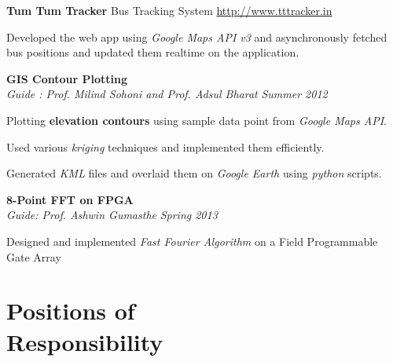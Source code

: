 \documentclass[margin,11pt]{resume}
\begin{document}
\begin{resume}
\textbf{Tum Tum Tracker} \hfill Bus Tracking System \hfill
    \url{http://www.tttracker.in}
\begin{list2}
\item Developed the web app using \emph{Google Maps API v3} and asynchronously fetched bus positions and updated them realtime  on the application.
\end{list2}


\textbf{GIS Contour Plotting}\\
  \textsl{Guide : Prof. Milind Sohoni and Prof. Adsul Bharat} \hfill \emph{Summer 2012}
\begin{list2}
\item Plotting \textbf{elevation contours} using sample data point from \emph{Google Maps API}.
\item Used various \emph{kriging} techniques and implemented them efficiently.
\item Generated \emph{KML} files and overlaid them on \emph{Google Earth} using \emph{python} scripts. \\
\end{list2}

\textbf{8-Point FFT on FPGA}\\ \textsl{Guide: Prof. Ashwin Gumasthe} \hfill \emph{Spring 2013}
\begin{list2}
\item Designed and implemented \emph{Fast Fourier Algorithm} on a Field Programmable Gate Array 
\end{list2}



\section{\mysidestyle Positions of\\Responsibility } 



\end{resume}
\end{document}
